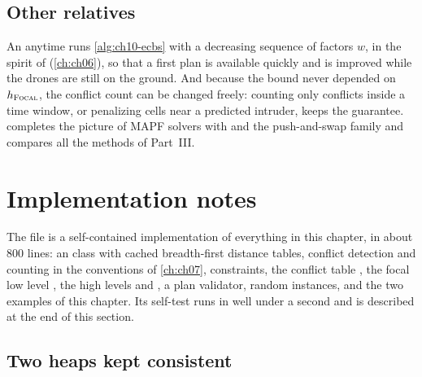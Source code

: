 \subsection{Other relatives}

An anytime \ecbs runs \cref{alg:ch10-ecbs} with a decreasing sequence of
factors $w$, in the spirit of \arastar (\cref{ch:ch06}), so that a first plan
is available quickly and is improved while the drones are still on the ground.
And because the bound never depended on $h_{\textsc{Focal}}$, the conflict count
can be changed freely: counting only conflicts inside a time window, or
penalizing cells near a predicted intruder, keeps the guarantee.
 completes the picture of MAPF solvers with \mstar and the
push-and-swap family and compares all the methods of Part~III.

\section{Implementation notes}
\label{sec:ch10-implementation}

The file  is a self-contained implementation of
everything in this chapter, in about 800 lines: an  class with
cached breadth-first distance tables, conflict detection and counting in the
conventions of \cref{ch:ch07}, constraints, the conflict table
, the focal low level , the
high levels  and , a plan validator, random instances,
and the two examples of this chapter. Its self-test runs in well under a
second and is described at the end of this section.

\subsection{Two heaps kept consistent}
\label{sec:ch10-two-heaps}

